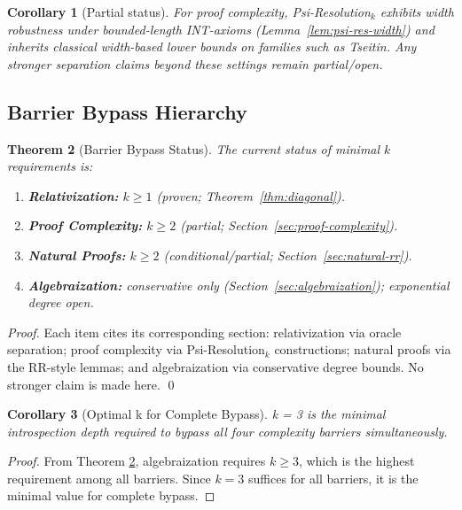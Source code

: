 \documentclass[11pt]{article}
\newtheorem{theorem}{Theorem}[section]
\newtheorem{corollary}[theorem]{Corollary}
\theoremstyle{definition}
\begin{document}
\begin{corollary}[Partial status]
For proof complexity, Psi-Resolution$_k$ exhibits width robustness under bounded-length INT-axioms (Lemma~\ref{lem:psi-res-width}) and inherits classical width-based lower bounds on families such as Tseitin. Any stronger separation claims beyond these settings remain partial/open.
\end{corollary}

\subsection{Barrier Bypass Hierarchy}

\begin{theorem}[Barrier Bypass Status]
\label{thm:barrier-hierarchy}
The current status of minimal $k$ requirements is:
\begin{enumerate}
\item \textbf{Relativization:} $k \geq 1$ (proven; Theorem~\ref{thm:diagonal}).
\item \textbf{Proof Complexity:} $k \geq 2$ (partial; Section~\ref{sec:proof-complexity}).
\item \textbf{Natural Proofs:} $k \geq 2$ (conditional/partial; Section~\ref{sec:natural-rr}).
\item \textbf{Algebraization:} conservative only (Section~\ref{sec:algebraization}); exponential degree open.
\end{enumerate}
\end{theorem}

\begin{proof}
Each item cites its corresponding section: relativization via oracle separation; proof complexity via Psi-Resolution$_k$ constructions; natural proofs via the RR-style lemmas; and algebraization via conservative degree bounds. No stronger claim is made here. \qed
\end{proof}

\begin{corollary}[Optimal k for Complete Bypass]
\label{cor:optimal-k}
k = 3 is the minimal introspection depth required to bypass all four complexity barriers simultaneously.
\end{corollary}

\begin{proof}
From Theorem \ref{thm:barrier-hierarchy}, algebraization requires $k \geq 3$, which is the highest requirement among all barriers. Since $k=3$ suffices for all barriers, it is the minimal value for complete bypass.
\end{proof}
\end{document}
